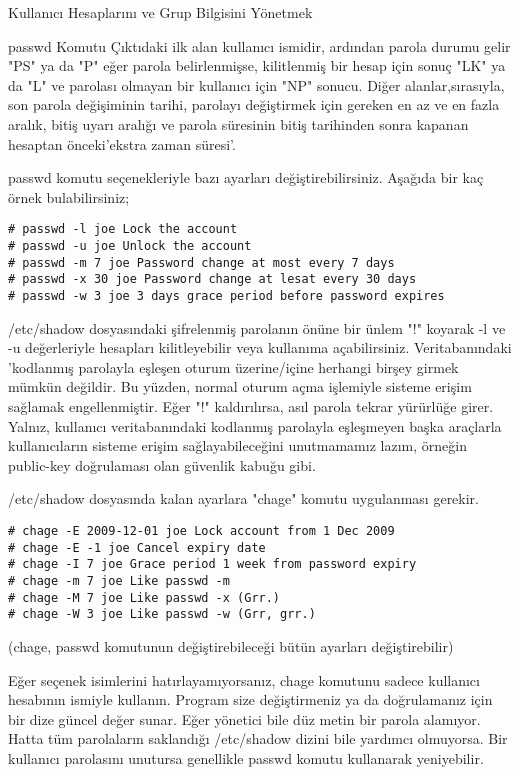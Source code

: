 \begin{section}{Kullanıcı Hesaplarını ve Grup Bilgisini Yönetmek}
\begin{subsection}{passwd Komutu}
Çıktıdaki ilk alan kullanıcı ismidir, ardından parola durumu gelir "PS" ya da "P" eğer parola belirlenmişse, kilitlenmiş bir hesap için sonuç "LK" ya da "L" ve parolası olmayan bir kullanıcı için "NP" sonucu. Diğer alanlar,sırasıyla, son parola değişiminin tarihi, parolayı değiştirmek için gereken en az ve en fazla aralık, bitiş uyarı aralığı ve parola süresinin bitiş tarihinden sonra kapanan hesaptan önceki'ekstra zaman süresi'.

passwd komutu seçenekleriyle bazı ayarları değiştirebilirsiniz. Aşağıda bir kaç örnek bulabilirsiniz; 
\begin{verbatim}
# passwd -l joe Lock the account
# passwd -u joe Unlock the account
# passwd -m 7 joe Password change at most every 7 days
# passwd -x 30 joe Password change at lesat every 30 days
# passwd -w 3 joe 3 days grace period before password expires
\end{verbatim}

/etc/shadow dosyasındaki şifrelenmiş parolanın önüne bir ünlem "!" koyarak -l ve -u değerleriyle hesapları kilitleyebilir veya kullanıma açabilirsiniz. Veritabanındaki 'kodlanmış parolayla eşleşen oturum üzerine/içine herhangi birşey girmek mümkün değildir. Bu yüzden, normal oturum açma işlemiyle sisteme erişim sağlamak engellenmiştir. Eğer "!" kaldırılırsa, asıl parola tekrar yürürlüğe girer. Yalnız, kullanıcı veritabanındaki kodlanmış parolayla eşleşmeyen başka araçlarla kullanıcıların sisteme erişim sağlayabileceğini unutmamamız lazım, örneğin public-key doğrulaması olan güvenlik kabuğu gibi.

/etc/shadow dosyasında kalan ayarlara "chage" komutu uygulanması gerekir.
\begin{verbatim}
# chage -E 2009-12-01 joe Lock account from 1 Dec 2009
# chage -E -1 joe Cancel expiry date
# chage -I 7 joe Grace period 1 week from password expiry
# chage -m 7 joe Like passwd -m
# chage -M 7 joe Like passwd -x (Grr.)
# chage -W 3 joe Like passwd -w (Grr, grr.)
\end{verbatim}

(chage, passwd komutunun değiştirebileceği bütün ayarları değiştirebilir)

Eğer seçenek isimlerini hatırlayamıyorsanız, chage komutunu sadece kullanıcı hesabının ismiyle kullanın. Program size değiştirmeniz ya da doğrulamanız için bir dize güncel değer sunar. Eğer yönetici bile düz metin bir parola alamıyor. Hatta tüm parolaların saklandığı /etc/shadow dizini bile yardımcı olmuyorsa. Bir kullanıcı parolasını unutursa genellikle passwd komutu kullanarak yeniyebilir.


\end{subsection}
\end{section}
